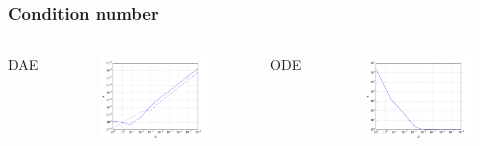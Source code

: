 \documentclass[]{beamer}
\begin{document}
\begin{frame}
\frametitle{Condition number}
\begin{columns}
\centering
DAE
\begin{figure}[ht]
\includegraphics[width=\linewidth]{dae_cond.png}
\end{figure}

\centering
ODE
\begin{figure}[ht]
\includegraphics[width=\linewidth]{ode_cond.png}
\end{figure}
\end{columns}
\end{frame}
\end{document}
